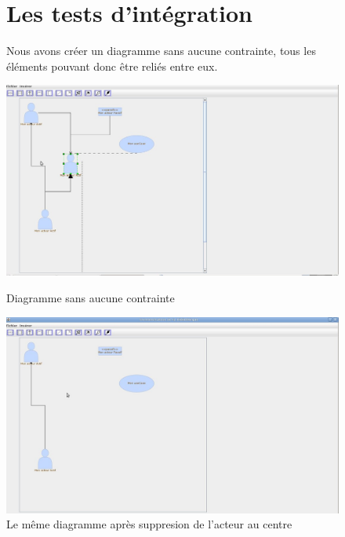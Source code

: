 \documentclass[12pt,a4paper,openany]{report}
\begin{document}
			\begin{figure}[H]
				\section{Les tests d'intégration}
					\begin{flushleft} Nous avons créer un diagramme sans aucune contrainte, tous les éléments pouvant donc être reliés entre eux. \end{flushleft}
					\centering
					\includegraphics[width=18cm]{integration1.jpg}
					\caption{Diagramme sans aucune contrainte}
				\includegraphics[width=18cm]{integration2.jpg}
				\caption{Le même diagramme après suppresion de l'acteur au centre}
			\end{figure}
\end{document}
